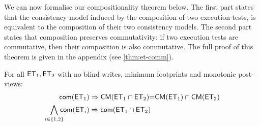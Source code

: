 %
%

We can now formalise our compositionality theorem below. 
The first part states that the consistency model induced by the composition of two execution tests, is equivalent to the composition of their two consistency models.
The second part states that composition preserves commutativity:
if two execution tests are commutative, then their composition is also commutative. 
The full proof of this theorem is given in the appendix (see \cref{thm:et-comm}). 
%
\begin{theorem}[Compositionality]     
For all $\mathsf{ET}_1, \mathsf{ET}_2$ with no blind writes, minimum footprints and monotonic post-views: 
\begin{align*}
	\mathsf{com}(\mathsf{ET}_1)
	& \Rightarrow \mathsf{CM}(\mathsf{ET}_1 \cap \mathsf{ET}_2) {=} \mathsf{CM}(\mathsf{ET}_1) \cap \mathsf{CM}(\mathsf{ET}_2)\\
	\bigwedge_{i \in \{1, 2\}} \!\!\!\!\mathsf{com}(\mathsf{ET}_i)
	& \Rightarrow  \mathsf{com}(\mathsf{ET}_1 \cap \mathsf{ET}_2)
\end{align*}
\end{theorem}

